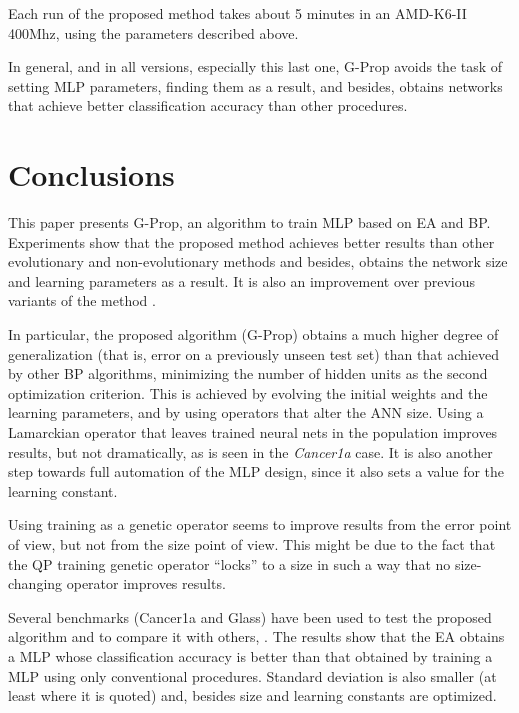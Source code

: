 \documentclass{llncs}
\begin{document}
Each run of the proposed method takes about 5 minutes in an AMD-K6-II 400Mhz, using the parameters described above.

In general, and in all versions, especially this last one, G-Prop avoids the task of setting MLP parameters, finding them as a result, and besides, obtains networks that achieve better classification accuracy than other procedures.

\section{Conclusions}
\label{sec:conclus}

This paper presents G-Prop, an algorithm to train MLP based on EA and BP. Experiments show that the proposed method achieves better results than other evolutionary and non-evolutionary methods and besides, obtains the network size and learning parameters as a result. It is also an improvement over previous variants of the method \cite{Castillo1}.

In particular, the proposed algorithm (G-Prop) obtains a much higher degree of generalization (that is, error on a previously unseen test set) than that achieved by other BP algorithms, minimizing the number of hidden units as the second optimization criterion. This is achieved by evolving the initial weights and the learning parameters, and by using operators that alter the ANN size.
Using a Lamarckian operator that leaves trained neural nets in the population improves results, but not dramatically, as is seen in the \emph{Cancer1a} case.
It is also another step towards full automation of the MLP design, since it also sets a value for the learning constant.

Using training as a genetic operator seems to improve results from the error point of view, but not from the size point of view. This might be due to the fact that the QP training genetic operator ``locks'' to a size in such a way that no size-changing operator improves results.

Several benchmarks (Cancer1a and Glass) have been used to test the proposed algorithm and to compare it with others, \cite{Prechelt94c,Castillo1,Castillo2,MAG98}. The results show that the EA obtains a MLP whose classification accuracy is better than that obtained by training a MLP using only conventional procedures. Standard deviation is also smaller (at least where it is quoted) and, besides size and learning constants are optimized.
\end{document}
